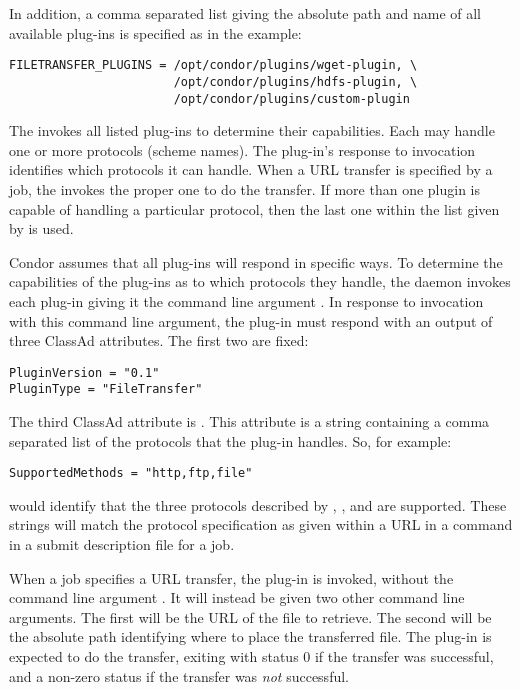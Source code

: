 In addition, a comma separated list giving the absolute path and name
of all available plug-ins is specified as in the example:
\footnotesize
\begin{verbatim}
FILETRANSFER_PLUGINS = /opt/condor/plugins/wget-plugin, \
                       /opt/condor/plugins/hdfs-plugin, \
                       /opt/condor/plugins/custom-plugin
\end{verbatim}
\normalsize

The  invokes all listed plug-ins to determine their 
capabilities. Each may handle one or more protocols (scheme names).
The plug-in's response to invocation identifies which protocols
it can handle.
When a URL transfer is specified by a job,
the  invokes the proper one to do the transfer.
If more than one plugin is capable of handling a particular protocol,
then the last one within the list given by 
is used.

Condor assumes that all plug-ins will respond in specific
ways.
To determine the capabilities of the plug-ins as to which protocols
they handle,
the \Condor{starter} daemon invokes each plug-in giving it the
command line argument .
In response to invocation with this command line argument,
the plug-in must respond with an output of three ClassAd attributes. 
The first two are fixed:
\footnotesize
\begin{verbatim}
PluginVersion = "0.1"
PluginType = "FileTransfer"
\end{verbatim}
\normalsize

The third ClassAd attribute is . 
This attribute is a string containing a comma separated list of the
protocols that the plug-in handles.
So, for example:
\footnotesize
\begin{verbatim}
SupportedMethods = "http,ftp,file"
\end{verbatim}
\normalsize
would identify that the three protocols described by \verb@http@,
\verb@ftp@, and \verb@ftp@ are supported.
These strings will match the protocol specification as given
within a URL in a  command 
in a submit description file for a job.

When a job specifies a URL transfer,
the plug-in is invoked, without the command line argument .
It will instead be given two other command line arguments.
The first will be the URL of the file to retrieve.
The second will be the absolute path identifying where to place the
transferred file.
The plug-in is expected to do the transfer,
exiting with status 0 if the transfer was successful, 
and a non-zero status if the transfer was \emph{not} successful.


